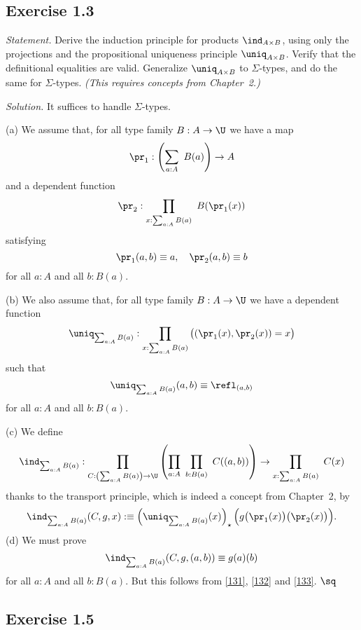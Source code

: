 \documentclass[12pt]{article}
\begin{document}
%

\subsection{Exercise 1.3} 

\emph{Statement.} Derive the induction principle for products $\ind_{A\times B}$, using only the projections and the propositional uniqueness principle $\uniq_{A\times B}$. Verify that the definitional equalities are valid. Generalize $\uniq_{A\times B}$ to $\Sigma$-types, and do the same for $\Sigma$-types. \emph{(This requires concepts from Chapter~2.)}

\nn\emph{Solution.} It suffices to handle $\Sigma$-types. 

\nn(a) We assume that, for all type family $B:A\to\U$ we have a map 
$$
\pr_1:\left(\sum_{a:A}\ B(a)\right)\to A
$$ 
and a dependent function 
$$
\pr_2:\prod_{x:\sum_{a:A}B(a)}\ B(\pr_1(x))
$$
satisfying
\begin{equation}\label{131}
\pr_1(a,b)\equiv a,\quad\pr_2(a,b)\equiv b
\end{equation}
for all $a:A$ and all $b:B(a)$.

\nn(b) We also assume that, for all type family $B:A\to\U$ we have a dependent function 
$$
\uniq_{\sum_{a:A}B(a)}:\prod_{x:\sum_{a:A}B(a)}\big((\pr_1(x),\pr_2(x))=x\big)
$$ 
such that 
\begin{equation}\label{132}
\uniq_{\sum_{a:A}B(a)}(a,b)\equiv\refl_{(a,b)}
\end{equation}
for all $a:A$ and all $b:B(a)$. 

\nn(c) We define
$$
\ind_{\sum_{a:A}B(a)}:\prod_{C:\left(\sum_{a:A}B(a)\right)\to\U} 
\left(\prod_{a:A}\ \prod_{b:B(a)}\ C((a,b))\right) 
\to\prod_{x:\sum_{a:A}B(a)}\ C(x)
$$
thanks to the transport principle, which is indeed a concept from Chapter~2, by
\begin{equation}\label{133}
\ind_{\sum_{a:A}B(a)}(C,g,x):\equiv\left(\uniq_{\sum_{a:A}B(a)}(x)\right)_\star\Big(g\big(\pr_1(x)\big)\big(\pr_2(x)\big)\Big).
\end{equation}
(d) We must prove 
$$
\ind_{\sum_{a:A}B(a)}(C,g,(a,b))\equiv g(a)(b)
$$
for all $a:A$ and all $b:B(a)$. But this follows from \eqref{131}, \eqref{132} and \eqref{133}. $\sq$


\subsection{Exercise 1.5}
\end{document}
